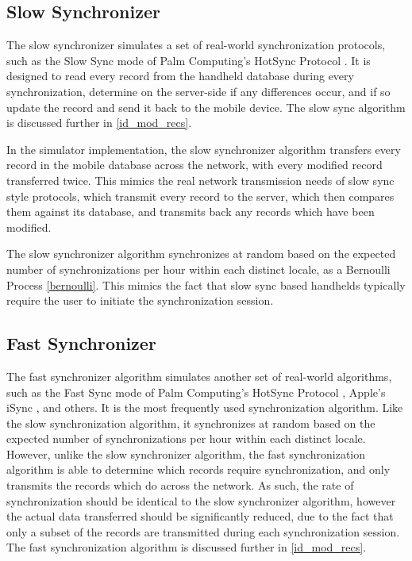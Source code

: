 \subsection{Slow Synchronizer}\label{slowsync}

The slow synchronizer simulates a set of real-world synchronization protocols, such as the Slow Sync mode of Palm Computing's HotSync Protocol \cite{RefWorks:1, RefWorks:2, RefWorks:24, RefWorks:31}.  It is designed to read every record from the handheld database during every synchronization, determine on the server-side if any differences occur, and if so update the record and send it back to the mobile device.  The slow sync algorithm is discussed further in \ref{id_mod_recs}.

In the simulator implementation, the slow synchronizer algorithm transfers every record in the mobile database across the network, with every modified record transferred twice.  This mimics the real network transmission needs of slow sync style protocols, which transmit every record to the server, which then compares them against its database, and transmits back any records which have been modified.

The slow synchronizer algorithm synchronizes at random based on the expected number of synchronizations per hour within each distinct locale, as a Bernoulli Process \ref{bernoulli}.  This mimics the fact that slow sync based handhelds typically require the user to initiate the synchronization session.

\subsection{Fast Synchronizer}\label{fastsync}

The fast synchronizer algorithm simulates another set of real-world algorithms, such as the Fast Sync mode of Palm Computing's HotSync Protocol \cite{RefWorks:2, RefWorks:22, RefWorks:31}, Apple's iSync \cite{RefWorks:33}, and others.  It is the most frequently used synchronization algorithm.  Like the slow synchronization algorithm, it synchronizes at random based on the expected number of synchronizations per hour within each distinct locale.  However, unlike the slow synchronizer algorithm, the fast synchronization algorithm is able to determine which records require synchronization, and only transmits the records which do across the network.  As such, the rate of synchronization should be identical to the slow synchronizer algorithm, however the actual data transferred should be significantly reduced, due to the fact that only a subset of the records are transmitted during each synchronization session.  The fast synchronization algorithm is discussed further in \ref{id_mod_recs}.

